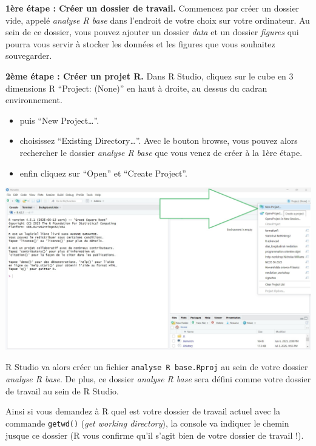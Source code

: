 \documentclass[
]{book}
\providecommand{\tightlist}{%
  \setlength{\itemsep}{0pt}\setlength{\parskip}{0pt}}
\begin{document}
\textbf{1ère étape : Créer un dossier de travail.} Commencez par créer un dossier vide, appelé \emph{analyse R base} dans l'endroit de votre choix sur votre ordinateur. Au sein de ce dossier, vous pouvez ajouter un dossier \emph{data} et un dossier \emph{figures} qui pourra vous servir à stocker les données et les figures que vous souhaitez souvegarder.

\textbf{2ème étape : Créer un projet R.} Dans R Studio, cliquez sur le cube en 3 dimensions R ``Project: (None)'' en haut à droite, au dessus du cadran environnement.

\begin{itemize}
\tightlist
\item
  puis ``New Project\ldots{}''.
\item
  choisissez ``Existing Directory\ldots{}''. Avec le bouton browse, vous pouvez alors rechercher le dossier \emph{analyse R base} que vous venez de créer à la 1ère étape.
\item
  enfin cliquez sur ``Open'' et ``Create Project''.
\end{itemize}

\begin{center}\includegraphics[width=1\linewidth]{./images/cree_nv_project} \end{center}

R Studio va alors créer un fichier \texttt{analyse\ R\ base.Rproj} au sein de votre dossier \emph{analyse R base}. De plus, ce dossier \emph{analyse R base} sera défini comme votre dossier de travail au sein de R Studio.

Ainsi si vous demandez à R quel est votre dossier de travail actuel avec la commande \texttt{getwd()} (\emph{get working directory}), la console va indiquer le chemin jusque ce dossier (R vous confirme qu'il s'agit bien de votre dossier de travail !).
\end{document}
